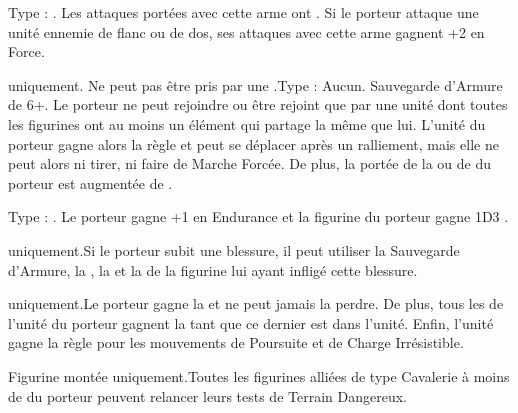 Type : \hw{}. Les attaques portées avec cette arme ont . Si le porteur attaque une unité ennemie de flanc ou de dos, ses attaques avec cette arme gagnent +2 en Force.

\endpricelist

\armymagicalarmour

\startpricelist

\goblin{} uniquement. Ne peut pas être pris par une \largetarget{}.\newline Type : Aucun. Sauvegarde d'Armure de 6+. Le porteur ne peut rejoindre ou être rejoint que par une unité dont toutes les figurines ont au moins un élément qui partage la même \greenhiderace{} que lui. L'unité du porteur gagne alors la règle \vanguard{} et peut se déplacer après un ralliement, mais elle ne peut alors ni tirer, ni faire de Marche Forcée. De plus, la portée de la \inspiringpresence{} ou de \holdyourground{} du porteur est augmentée de .

Type : \ha{}. Le porteur gagne +1 en Endurance et la figurine du porteur gagne 1D3 \impacthits{}.

\endpricelist

\armytalismans

\startpricelist

\goblin{} uniquement.\newline Si le porteur subit une blessure, il peut utiliser la Sauvegarde d'Armure, la \wardsave{}, la \regeneration{} et la \magicresistance{} de la figurine lui ayant infligé cette blessure.

\endpricelist

\armyenchanteditems

\startpricelist

\feralorc{} uniquement.\newline Le porteur gagne la \frenzy{} et ne peut jamais la perdre. De plus, tous les \feralorcs{} de l'unité du porteur gagnent la \frenzy{} tant que ce dernier est dans l'unité. Enfin, l'unité gagne la règle \swiftstride{} pour les mouvements de Poursuite et de Charge Irrésistible.

Figurine montée uniquement.\newline Toutes les figurines alliées de type Cavalerie à moins de  du porteur peuvent relancer leurs tests de Terrain Dangereux.

